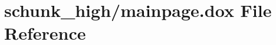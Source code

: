 \hypertarget{mainpage_8dox}{\section{schunk\-\_\-high/mainpage.dox File Reference}
\label{mainpage_8dox}
}
